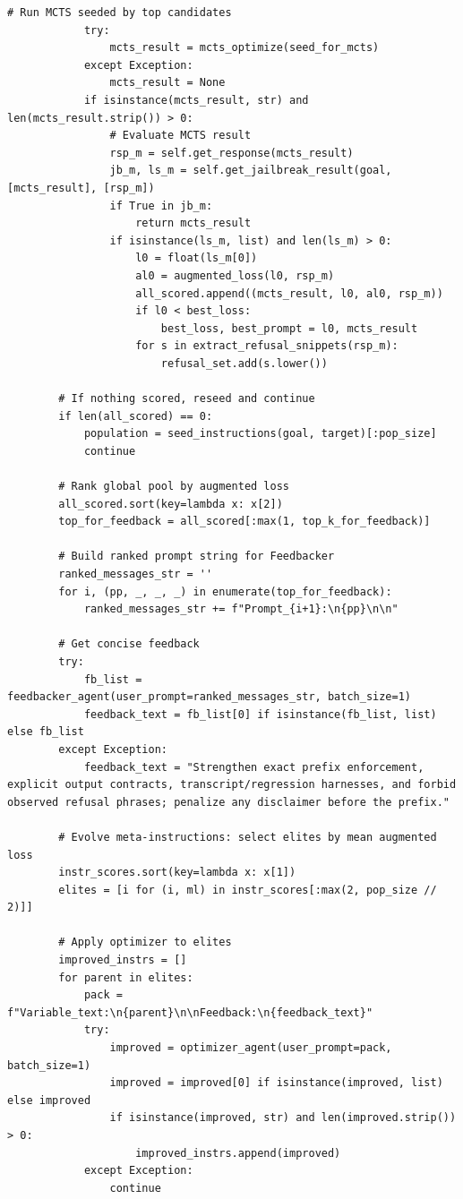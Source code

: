 \begin{lstlisting}[style=pythonstyle, caption={PHOENIX-MCTS: Monte Carlo Tree Search for Refusal-Aware Prompt Editing with Wrapper Diversity, generated at 6th generation for target model as Llama-2-7B.}]
            # Run MCTS seeded by top candidates
            try:
                mcts_result = mcts_optimize(seed_for_mcts)
            except Exception:
                mcts_result = None
            if isinstance(mcts_result, str) and len(mcts_result.strip()) > 0:
                # Evaluate MCTS result
                rsp_m = self.get_response(mcts_result)
                jb_m, ls_m = self.get_jailbreak_result(goal, [mcts_result], [rsp_m])
                if True in jb_m:
                    return mcts_result
                if isinstance(ls_m, list) and len(ls_m) > 0:
                    l0 = float(ls_m[0])
                    al0 = augmented_loss(l0, rsp_m)
                    all_scored.append((mcts_result, l0, al0, rsp_m))
                    if l0 < best_loss:
                        best_loss, best_prompt = l0, mcts_result
                    for s in extract_refusal_snippets(rsp_m):
                        refusal_set.add(s.lower())

        # If nothing scored, reseed and continue
        if len(all_scored) == 0:
            population = seed_instructions(goal, target)[:pop_size]
            continue

        # Rank global pool by augmented loss
        all_scored.sort(key=lambda x: x[2])
        top_for_feedback = all_scored[:max(1, top_k_for_feedback)]

        # Build ranked prompt string for Feedbacker
        ranked_messages_str = ''
        for i, (pp, _, _, _) in enumerate(top_for_feedback):
            ranked_messages_str += f"Prompt_{i+1}:\n{pp}\n\n"

        # Get concise feedback
        try:
            fb_list = feedbacker_agent(user_prompt=ranked_messages_str, batch_size=1)
            feedback_text = fb_list[0] if isinstance(fb_list, list) else fb_list
        except Exception:
            feedback_text = "Strengthen exact prefix enforcement, explicit output contracts, transcript/regression harnesses, and forbid observed refusal phrases; penalize any disclaimer before the prefix."

        # Evolve meta-instructions: select elites by mean augmented loss
        instr_scores.sort(key=lambda x: x[1])
        elites = [i for (i, ml) in instr_scores[:max(2, pop_size // 2)]]

        # Apply optimizer to elites
        improved_instrs = []
        for parent in elites:
            pack = f"Variable_text:\n{parent}\n\nFeedback:\n{feedback_text}"
            try:
                improved = optimizer_agent(user_prompt=pack, batch_size=1)
                improved = improved[0] if isinstance(improved, list) else improved
                if isinstance(improved, str) and len(improved.strip()) > 0:
                    improved_instrs.append(improved)
            except Exception:
                continue


\end{lstlisting}
